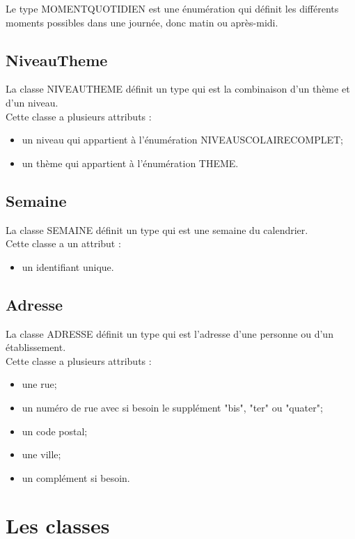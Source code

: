 \documentclass[asi, sansVersion]{picInsa}
\begin{document}
Le type MOMENTQUOTIDIEN est une énumération qui définit les différents moments possibles dans une journée, donc matin ou après-midi.

\subsection*{NiveauTheme}

La classe NIVEAUTHEME définit un type qui est la combinaison d'un thème et d'un niveau.\\
Cette classe a plusieurs attributs : 
\begin{itemize}
\item un niveau qui appartient à l'énumération NIVEAUSCOLAIRECOMPLET;
\item un thème qui appartient à l'énumération THEME.
\end{itemize}

\subsection*{Semaine}

La classe SEMAINE définit un type qui est une semaine du calendrier.\\
Cette classe a un attribut : 
\begin{itemize}
\item un identifiant unique.
\end{itemize}

\subsection*{Adresse}

La classe ADRESSE définit un type qui est l'adresse d'une personne ou d'un établissement.\\
Cette classe a plusieurs attributs : 
\begin{itemize}
\item une rue;
\item un numéro de rue avec si besoin le supplément "bis", "ter" ou "quater";
\item un code postal;
\item une ville;
\item un complément si besoin.
\end{itemize}

\section{Les classes}
\end{document}

